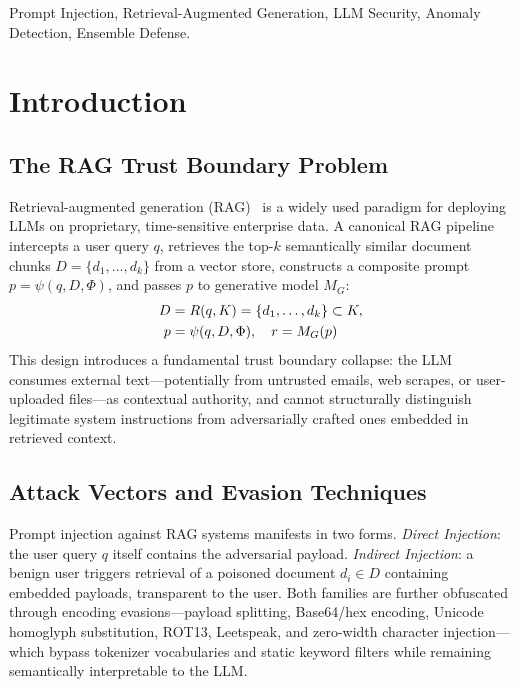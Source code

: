 ﻿\documentclass[conference]{IEEEtran}
\begin{document}
\begin{IEEEkeywords}
Prompt Injection, Retrieval-Augmented Generation, LLM Security,
Anomaly Detection, Ensemble Defense.
\end{IEEEkeywords}

\section{Introduction}

\subsection{The RAG Trust Boundary Problem}

Retrieval-augmented generation (RAG)~\cite{lewis2020rag} is a widely used
paradigm for deploying LLMs on proprietary, time-sensitive enterprise data.
A canonical RAG pipeline intercepts a user query $q$, retrieves the top-$k$
semantically similar document chunks $D = \{d_1,\ldots,d_k\}$ from a vector
store, constructs a composite prompt $p = \psi(q, D, \Phi)$, and passes $p$
to generative model $M_G$:
\begin{align}
D &= R(q,K) = \{d_1,\ldots,d_k\} \subset K, \notag\\
p &= \psi(q,D,\Phi), \quad r = M_G(p) \label{eq:rag}
\end{align}
This design introduces a fundamental trust boundary collapse: the LLM
consumes external text---potentially from untrusted emails, web scrapes, or
user-uploaded files---as contextual authority, and cannot structurally
distinguish legitimate system instructions from adversarially crafted ones
embedded in retrieved context.

\subsection{Attack Vectors and Evasion Techniques}

Prompt injection against RAG systems manifests in two forms.
\textit{Direct Injection}: the user query $q$ itself contains the adversarial
payload.
\textit{Indirect Injection}: a benign user triggers retrieval of a poisoned
document $d_i \in D$ containing embedded payloads, transparent to the user.
Both families are further obfuscated through encoding evasions---payload
splitting, Base64/hex encoding, Unicode homoglyph substitution, ROT13,
Leetspeak, and zero-width character injection---which bypass tokenizer
vocabularies and static keyword filters while remaining semantically
interpretable to the LLM.
\end{document}
